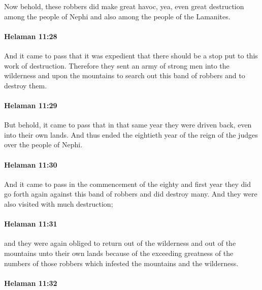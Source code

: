 			Now behold, these robbers did make great havoc,
			yea, even great destruction among the people of Nephi
			and also among the people of the Lamanites.

		\paragraph{Helaman 11:28} %
			\label{HELAMAN-11-28}

			And it came to pass that it was expedient
			that there should be a stop put to this work of destruction.
			Therefore they sent an army of strong men
			into the wilderness and upon the mountains
			to search out this band of robbers and to destroy them.

		\paragraph{Helaman 11:29} %
			\label{HELAMAN-11-29}

			But behold, it came to pass that in that same year
			they were driven back, even into their own lands.
			And thus ended the eightieth year
			of the reign of the judges over the people of Nephi.

		\paragraph{Helaman 11:30} %
			\label{HELAMAN-11-30}

			And it came to pass in the commencement of the eighty and first year
			they did go forth again against this band of robbers and did destroy many.
			And they were also visited with much destruction;

		\paragraph{Helaman 11:31} %
			\label{HELAMAN-11-31}

			and they were again obliged to return
			out of the wilderness and out of the mountains unto their own lands
			because of the exceeding greatness of the numbers of those robbers
			which infested the mountains and the wilderness.

		\paragraph{Helaman 11:32} %
			\label{HELAMAN-11-32}


